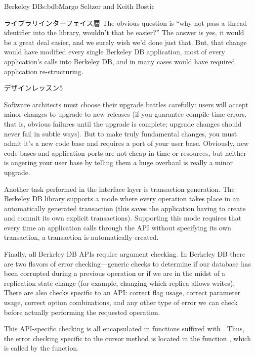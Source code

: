 \begin{aosachapter}{Berkeley DB}{s:bdb}{Margo Seltzer and Keith Bostic}
\begin{aosasect1}{ライブラリインターフェイス層}
The obvious question is ``why not pass a thread identifier into the
library, wouldn't that be easier?'' The answer is yes, it would be a
great deal easier, and we surely wish we'd done just that. But, that
change would have modified every single Berkeley DB application, most
of every application's calls into Berkeley DB, and in many cases would
have required application re-structuring. 

\begin{aosabox}{デザインレッスン5}

Software architects must choose their upgrade battles carefully: users
will accept minor changes to upgrade to new releases (if you guarantee
compile-time errors, that is, obvious failures until the upgrade is
complete; upgrade changes should never fail in subtle ways). But to
make truly fundamental changes, you must admit it's a new code base
and requires a port of your user base. Obviously, new code bases and
application ports are not cheap in time or resources, but neither is
angering your user base by telling them a huge overhaul is really a
minor upgrade.

\end{aosabox}

Another task performed in the interface layer is transaction
generation.  The Berkeley DB library supports a mode where every
operation takes place in an automatically generated transaction (this
saves the application having to create and commit its own explicit
transactions). Supporting this mode requires that every time an
application calls through the API without specifying its own
transaction, a transaction is automatically created.

Finally, all Berkeley DB APIs require argument checking. In Berkeley
DB there are two flavors of error checking---generic checks to
determine if our database has been corrupted during a previous
operation or if we are in the midst of a replication state change (for
example, changing which replica allows writes). There are also checks
specific to an API: correct flag usage, correct parameter usage,
correct option combinations, and any other type of error we can check
before actually performing the requested operation.

This API-specific checking is all encapsulated in functions suffixed
with . Thus, the error checking specific to the cursor
 method is located in the function ,
which is called by the  function.


\end{aosasect1}
\end{aosachapter}
